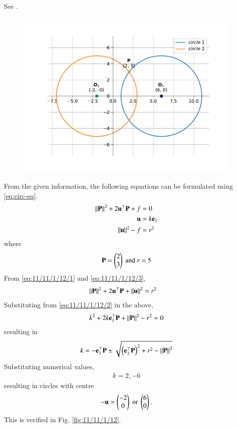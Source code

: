See 
		.
	\begin{figure}[H]
		\centering
 \includegraphics[width=0.75\columnwidth]{chapters/11/11/1/12/figs/fig.pdf}
		\caption{}
		\label{fig:11/11/1/12}
  	\end{figure}
From the given information, the following equations can be formulated
using 
	\eqref{eq:circ-eq}.
\begin{align}
		\label{eq:11/11/1/12/1}
	\left\lVert\mathbf{P}\right\rVert^2 + 2 \mathbf{u}^{\top}\mathbf{P} + f &= 0
	\\
		\label{eq:11/11/1/12/2}
	\mathbf{u} &= k\mathbf{e}_1
	\\
		\label{eq:11/11/1/12/3}
	\left\lVert\mathbf{u}\right\rVert^2 - f &= r^2
\end{align}
where 
\begin{align}
	\mathbf{P} = \begin{pmatrix}2\\3\end{pmatrix} \text{ and } r = 5
\end{align}
From 
		\eqref{eq:11/11/1/12/1}
		and 
		\eqref{eq:11/11/1/12/3},
\begin{align}
	\left\lVert\mathbf{P}\right\rVert^2 + 2 \mathbf{u}^{\top}\mathbf{P} + \left\lVert\mathbf{u}\right\rVert^2 &= r^2
\end{align}
Substituting from 
		\eqref{eq:11/11/1/12/2} in the above, 
\begin{align}
	k^2  + 2k \mathbf{e}_1^{\top}\mathbf{P} + \left\lVert\mathbf{P}\right\rVert^2- r^2 = 0
\end{align}
resulting in 
\begin{align}
	k =  - \mathbf{e}_1^{\top}\mathbf{P} \pm \sqrt{\left({ \mathbf{e}_1^{\top}\mathbf{P}  }\right)^2 + r^2 - \left\lVert\mathbf{P}\right\rVert^2 } 
\end{align}
Substituting numerical values, 
\begin{align}
	k = 2, -6
\end{align}
resulting in circles with centre
\begin{align}
	-\mathbf{u} = \begin{pmatrix}-2 \\ 0\end{pmatrix} \text{ or } \begin{pmatrix}6 \\ 0\end{pmatrix}.
\end{align}
This is verified in Fig. 
		\eqref{fig:11/11/1/12}.
